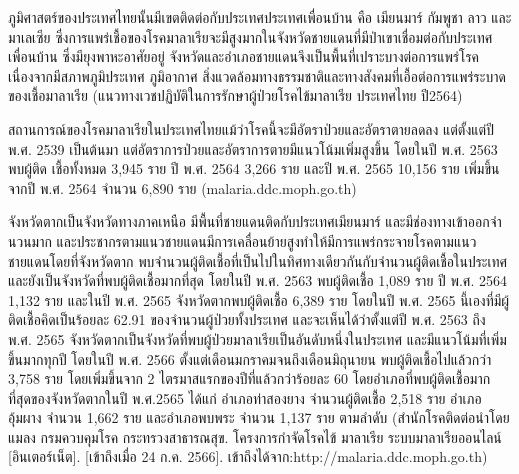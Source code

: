 \begin{titlepage}
\begin{enumerate}
          ภูมิศาสตร์ของประเทศไทยนั้นมีเขตติดต่อกับประเทศประเทศเพื่อนบ้าน คือ เมียนมาร์ กัมพูชา ลาว และมาเลเซีย ซึ่งการแพร่เชื้อของโรคมาลาเรียจะมีสูงมากในจังหวัดชายแดนที่มีป่าเขาเชื่อมต่อกับประเทศเพื่อนบ้าน ซึ่งมียุงพาหะอาศัยอยู่ จังหวัดและอำเภอชายแดนจึงเป็นพื้นที่เปราะบางต่อการแพร่โรคเนื่องจากมีสภาพภูมิประเทศ ภูมิอากาศ สิ่งแวดล้อมทางธรรมชาติและทางสังคมที่เอื้อต่อการแพร่ระบาดของเชื้อมาลาเรีย  (แนวทางเวชปฏิบัติในการรักษาผู้ป่วยโรคไข้มาลาเรีย ประเทศไทย ปี2564)

          สถานการณ์ของโรคมาลาเรียในประเทศไทยแม้ว่าโรคนี้จะมีอัตราป่วยและอัตราตายลดลง แต่ตั้งแต่ปี  พ.ศ. 2539 เป็นต้นมา แต่อัตราการป่วยและอัตราการตายมีแนวโน้มเพิ่มสูงขึ้น โดยในปี พ.ศ. 2563 พบผู้ติด เชื้อทั้งหมด 3,945 ราย ปี พ.ศ. 2564 3,266 ราย และปี พ.ศ. 2565 10,156 ราย  เพิ่มขึ้นจากปี พ.ศ. 2564 จำนวน 6,890 ราย (malaria.ddc.moph.go.th)

          จังหวัดตากเป็นจังหวัดทางภาคเหนือ มีพื้นที่ชายแดนติดกับประเทศเมียนมาร์  และมีช่องทางเข้าออกจํานวนมาก และประชากรตามแนวชายแดนมีการเคลื่อนย้ายสูงทําให้มีการแพร่กระจายโรคตามแนวชายแดนโดยที่จังหวัดตาก พบจำนวนผู้ติดเชื้อที่เป็นไปในทิศทางเดียวกันกับจำนวนผู้ติดเชื้อในประเทศ และยังเป็นจังหวัดที่พบผู้ติดเชื้อมากที่สุด โดยในปี พ.ศ. 2563 พบผู้ติดเชื้อ 1,089 ราย ปี พ.ศ. 2564 1,132 ราย และในปี พ.ศ. 2565 จังหวัดตากพบผู้ติดเชื้อ 6,389 ราย  โดยในปี พ.ศ. 2565 นี้เองที่มีผู้ติดเชื้อคิดเป็นร้อยละ 62.91 ของจำนวนผู้ป่วยทั้งประเทศ และจะเห็นได้ว่าตั้งแต่ปี พ.ศ. 2563 ถึง พ.ศ. 2565 จังหวัดตากเป็นจังหวัดที่พบผู้ป่วยมาลาเรียเป็นอันดับหนึ่งในประเทศ และมีแนวโน้มที่เพิ่มขึ้นมากทุกปี โดยในปี พ.ศ. 2566 ตั้งแต่เดือนมกราคมจนถึงเดือนมิถุนายน พบผู้ติดเชื้อไปแล้วกว่า 3,758 ราย โดยเพิ่มขึ้นจาก 2 ไตรมาสแรกของปีที่แล้วกว่าร้อยละ 60 โดยอำเภอที่พบผู้ติดเชื้อมากที่สุดของจังหวัดตากในปี พ.ศ.2565 ได้แก่ อำเภอท่าสองยาง จำนวนผู้ติดเชื้อ 2,518 ราย อำเภออุ้มผาง จำนวน 1,662 ราย และอำเภอพบพระ จำนวน 1,137 ราย ตามลำดับ (สํานักโรคติดต่อนําโดยแมลง  กรมควบคุมโรค กระทรวงสาธารณสุข.  โครงการกําจัดโรคไข้  มาลาเรีย ระบบมาลาเรียออนไลน์ [อินเตอร์เน็ต]. [เข้าถึงเมื่อ  24  ก.ค.  2566].  เข้าถึงได้จาก:http://malaria.ddc.moph.go.th)


\end{enumerate}
\end{titlepage}
